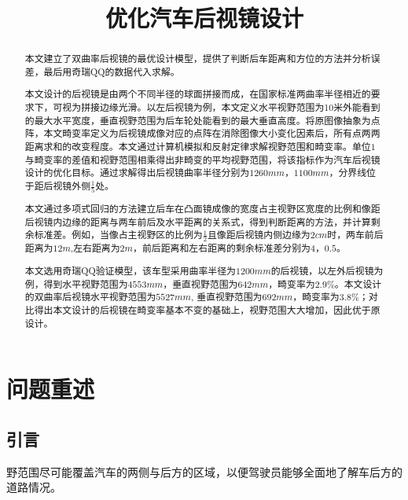\documentclass[withoutpreface,bwprint]{cumcmthesis} %
\title{优化汽车后视镜设计}
\begin{document}
 \maketitle
\begin{abstract}
 
\par 本文建立了双曲率后视镜的最优设计模型，提供了判断后车距离和方位的方法并分析误差，最后用奇瑞QQ的数据代入求解。
\par 本⽂设计的后视镜是由两个不同半径的球面拼接而成，在国家标准两曲率半径相近的要求下，可视为拼接边缘光滑。以左后视镜为例，本文定义水平视野范围为10米外能看到的最大水平宽度，垂直视野范围为后车轮处能看到的最大垂直高度。将原图像抽象为点阵，本文畸变率定义为后视镜成像对应的点阵在消除图像大小变化因素后，所有点两两距离求和的改变程度。本文通过计算机模拟和反射定律求解视野范围和畸变率。单位$1$与畸变率的差值和视野范围相乘得出非畸变的平均视野范围，将该指标作为汽车后视镜设计的优化目标。通过求解得出后视镜曲率半径分别为$1260mm$，$1100mm$，分界线位于距后视镜外侧$\frac{1}{5}$处。
\par 本文通过多项式回归的方法建立后车在凸面镜成像的宽度占主视野区宽度的比例和像距后视镜内边缘的距离与两车前后及水平距离的关系式，得到判断距离的方法，并计算剩余标准差。例如，当像占主视野区的比例为$\frac{1}{2}$且像距后视镜内侧边缘为$2cm$时，两车前后距离为$12m$,左右距离为$2m$，前后距离和左右距离的剩余标准差分别为$4$，$0.5$。
\par 本⽂选⽤奇瑞QQ验证模型，该车型采⽤曲率半径为$1200mm$的后视镜，以左外后视镜为例，得到水平视野范围为$4553mm$，垂直视野范围为$642mm$，畸变率为$2.9\%$。本⽂设计的双曲率后视镜水平视野范围为$5527mm$, 垂直视野范围为$692mm$，畸变率为$3.8\%$；对⽐得出本文设计的后视镜在畸变率基本不变的基础上，视野范围⼤⼤增加，因此优于原设计。

 
\end{abstract}

\tableofcontents
\newpage

\section{问题重述}
 

\subsection{引言}

\par 野范围尽可能覆盖汽车的两侧与后方的区域，以便驾驶员能够全面地了解车后方的道路情况。
\end{document}
